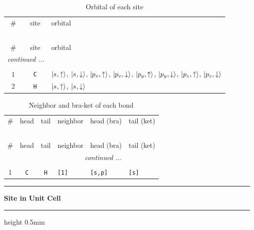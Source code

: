 \documentclass[fleqn,10pt,landscape]{jsarticle}
\begin{document}
\renewcommand{\arraystretch}{1.6}
\begin{longtable}[l]{ccl}
\captionsetup{justification=raggedright, singlelinecheck=off}
\caption{Orbital of each site}
 \\
 \hline \hline
\# & site & orbital \\ \hline \endfirsthead

\multicolumn{2}{l}{\tablename\ \thetable{}} \\
 \hline \hline
\# & site & orbital \\ \hline \endhead

 \hline \hline
\multicolumn{2}{r}{\footnotesize\it continued ...} \\ \endfoot

 \hline \hline
\multicolumn{2}{r}{} \\ \endlastfoot

1 & \texttt{C} & $\ket{s_{},\uparrow}$, $\ket{s_{},\downarrow}$, $\ket{p_{x},\uparrow}$, $\ket{p_{x},\downarrow}$, $\ket{p_{y},\uparrow}$, $\ket{p_{y},\downarrow}$, $\ket{p_{z},\uparrow}$, $\ket{p_{z},\downarrow}$ \\ \hline
2 & \texttt{H} & $\ket{s_{},\uparrow}$, $\ket{s_{},\downarrow}$ \\
\end{longtable}
\renewcommand{\arraystretch}{1.6}
\begin{longtable}[l]{ccclll}
\captionsetup{justification=raggedright, singlelinecheck=off}
\caption{Neighbor and bra-ket of each bond}
 \\
 \hline \hline
\# & head & tail & neighbor & head (bra) & tail (ket) \\ \hline \endfirsthead

\multicolumn{5}{l}{\tablename\ \thetable{}} \\
 \hline \hline
\# & head & tail & neighbor & head (bra) & tail (ket) \\ \hline \endhead

 \hline \hline
\multicolumn{5}{r}{\footnotesize\it continued ...} \\ \endfoot

 \hline \hline
\multicolumn{5}{r}{} \\ \endlastfoot

1 & \texttt{C} & \texttt{H} & \texttt{[1]} & \texttt{[s,p]} & \texttt{[s]} \\
\end{longtable}
\vspace{5mm}
\noindent \rule[0.5mm]{5mm}{0.5mm}\hspace{3mm}\textbf{Site in Unit Cell}\hspace{3mm}\leaders\hrule height 0.5mm\hfill\kern0pt
\vspace{3mm}
\end{document}
